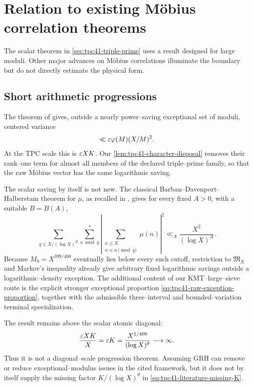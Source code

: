 \section{Relation to existing M\"obius correlation theorems}
\label{sec:tpc41-literature}

The scalar theorem in \cref{sec:tpc41-triple-prime} uses a result designed
for large moduli.  Other major advances on M\"obius correlations illuminate
the boundary but do not directly estimate the physical form.

\subsection{Short arithmetic progressions}

The theorem of \citet{KlurmanMangerelTeravainen2023} gives, outside a
nearly power--saving exceptional set of moduli, centered variance
\begin{equation}
 \ll\varepsilon\varphi(M)(X/M)^2.
 \label{eq:tpc41-literature-KMT}
\end{equation}
At the TPC scale this is \(\varepsilon XK\).  Our
\cref{lem:tpc41-character-disposal} removes their rank--one term for
almost all members of the declared triple--prime family, so that the raw
M\"obius vector has the same logarithmic saving.

The scalar saving by itself is not new.  The classical
Barban--Davenport--Halberstam theorem for \(\mu\), as recalled in
\citet[Section~3.1.3]{KlurmanMangerelTeravainen2023}, gives for every
fixed \(A>0\), with a suitable \(B=B(A)\),
\begin{equation}
 \sum_{q\le X/(\log X)^B}
 \sum_{a\bmod q}^{*}
 \left|\sum_{\substack{n\le X\\n\equiv a\pmod q}}\mu(n)\right|^2
 \ll_A\frac{X^2}{(\log X)^A}.
 \label{eq:tpc41-literature-BDH}
\end{equation}
Because \(M_0=X^{399/400}\) eventually lies below every such cutoff,
restriction to \(\mathfrak M_X\) and Markov's inequality already give
arbitrary fixed logarithmic savings outside a logarithmic--density
exception.  The additional content of our KMT--large--sieve route is the
explicit stronger exceptional proportion
\eqref{eq:tpc41-raw-exception-proportion}, together with the admissible
three--interval and bounded--variation terminal specialization.

The result remains above the scalar atomic diagonal:
\begin{equation}
 \frac{\varepsilon XK}{X}=\varepsilon K
 =\frac{X^{1/400}}{(\log X)^\theta}\longrightarrow\infty.
 \label{eq:tpc41-literature-missing-K}
\end{equation}
Thus it is not a diagonal--scale progression theorem.  Assuming GRH can
remove or reduce exceptional--modulus issues in the cited framework, but
it does not by itself supply the missing factor
\(K/(\log X)^\theta\) in
\eqref{eq:tpc41-literature-missing-K}.


